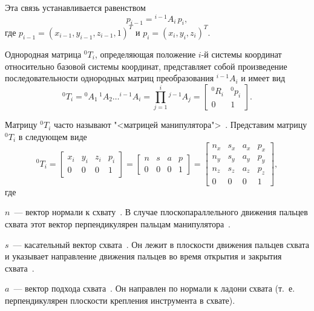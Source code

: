 \documentclass[oneside, final, 14pt]{extarticle}
\begin{document}
Эта связь устанавливается равенством
\begin{equation}
  p_{i-1} = {}^{i-1}A_i\,p_i
  ,
\end{equation}
где \(p_{i-1} = (x_{i-1}, y_{i-1}, z_{i-1}, 1)^T\) и \(p_i = (x_i, y_i, z_i)^T\).
\par
Однородная матрица \({}^0T_i\), определяющая положение \(i\)-й системы координат относительно базовой системы координат, представляет собой произведение последовательности однородных матриц преобразования \({}^{i-1}A_i\) и имеет вид~\cite{fu:rob_tech}
\begin{equation}
  {}^0T_i = {}^{0}A_1\,{}^{1}A_2\ldots{}^{i-1}A_i = \prod^i_{j = 1} {}^{j-1}A_j = 
  \begin{bmatrix}
    {}^0R_i & {}^0p_i \\
	0 & 1
  \end{bmatrix}
  .
\end{equation}
\par
Матрицу \({}^0T_i\) часто называют "<матрицей манипулятора">~\cite{fu:rob_tech}.
Представим матрицу \({}^0T_i\) в следующем виде~\cite{fu:rob_tech}
\begin{equation}
  {}^0T_i = 
  \begin{bmatrix}
    x_i & y_i & z_i & p_i \\
	0 & 0 & 0 & 1
  \end{bmatrix}
  =
  \begin{bmatrix}
    n & s & a & p \\
	0 & 0 & 0 & 1
  \end{bmatrix}
  =
  \begin{bmatrix}
    n_x & s_x & a_x & p_x \\
    n_y & s_y & a_y & p_y \\
    n_z & s_z & a_z & p_z \\
	0 & 0 & 0 & 1
  \end{bmatrix}
  ,
\end{equation}
где
\par
\(n\)~--- вектор нормали к схвату~\cite{fu:rob_tech}. В случае плоскопараллельного движения пальцев схвата этот вектор перпендикулярен пальцам манипулятора~\cite{fu:rob_tech}.
\par
\(s\)~--- касательный вектор схвата~\cite{fu:rob_tech}. Он лежит в плоскости движения пальцев схвата и указывает направление движения пальцев во время открытия и закрытия схвата~\cite{fu:rob_tech}.
\par
\(a\)~--- вектор подхода схвата~\cite{fu:rob_tech}. Он направлен по нормали к ладони схвата (т.~е. перпендикулярен плоскости крепления инструмента в схвате).
\end{document}
